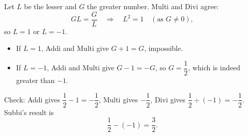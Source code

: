Let $L$ be the lesser and $G$ the greater number. Multi and Divi agree:
\[GL=\dfrac{G}{L}\quad\Longrightarrow\quad L^2=1\quad(\text{as }G\ne0),\]
so $L=1$ or $L=-1$.
\begin{itemize}
\item If $L=1$, Addi and Multi give $G+1=G$, impossible.
\item If $L=-1$, Addi and Multi give $G-1=-G$, so $G=\dfrac{1}{2}$, which is indeed greater than $-1$.
\end{itemize}
Check: Addi gives $\dfrac{1}{2}-1=-\dfrac{1}{2}$, Multi gives $-\dfrac{1}{2}$, Divi gives $\dfrac{1}{2}\div(-1)=-\dfrac{1}{2}$. Subbi's result is
\[\dfrac{1}{2}-(-1)=\boxed{\dfrac{3}{2}}.\]
